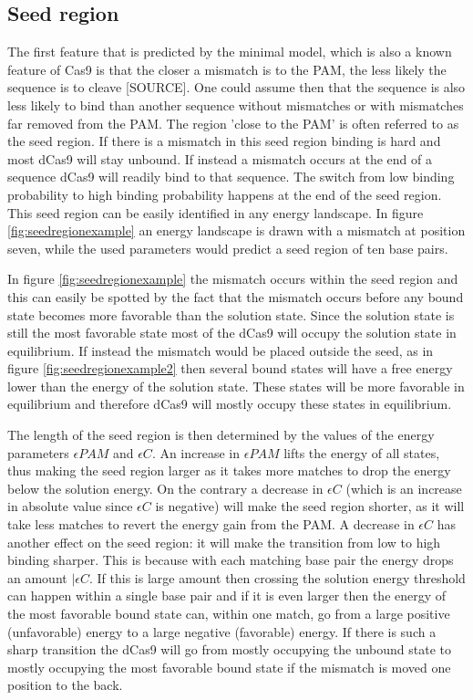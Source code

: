 \subsection{Seed region}
The first feature that is predicted by the minimal model, which is also a known feature of Cas9 is that the closer a mismatch is to the PAM, the less likely the sequence is to cleave [SOURCE]. One could assume then that the sequence is also less likely to bind than another sequence without mismatches or with mismatches far removed from the PAM. The region 'close to the PAM' is often referred to as the seed region. If there is a mismatch in this seed region binding is hard and most dCas9 will stay unbound. If instead a mismatch occurs at the end of a sequence dCas9 will readily bind to that sequence. The switch from low binding probability to high binding probability happens at the end of the seed region. This seed region can be easily identified in any energy landscape. In figure \ref{fig:seedregionexample} an energy landscape is drawn with a mismatch at position seven, while the used parameters would predict a seed region of ten base pairs.


In figure \ref{fig:seedregionexample} the mismatch occurs within the seed region and this can easily be spotted by the fact that the mismatch occurs before any bound state becomes more favorable than the solution state. Since the solution state is still the most favorable state most of the dCas9 will occupy the solution state in equilibrium. If instead the mismatch would be placed outside the seed, as in figure \ref{fig:seedregionexample2} then several bound states will have a free energy lower than the energy of the solution state. These states will be more favorable in equilibrium and therefore dCas9 will mostly occupy these states in equilibrium.

The length of the seed region is then determined by the values of the energy parameters $\epsilon PAM$ and $\epsilon C$. An increase in $\epsilon PAM$ lifts the energy of all states, thus making the seed region larger as it takes more matches to drop the energy below the solution energy. On the contrary a decrease in $\epsilon C$ (which is an increase in absolute value since $\epsilon C$ is negative) will make the seed region shorter, as it will take less matches to revert the energy gain from the PAM. A decrease in $\epsilon C$ has another effect on the seed region: it will make the transition from low to high binding sharper. This is because with each matching base pair the energy drops an amount $|\epsilon C$. If this is large amount then crossing the solution energy threshold can happen within a single base pair and if it is even larger then the energy of the most favorable bound state can, within one match, go from a large positive (unfavorable) energy to a large negative (favorable) energy. If there is such a sharp transition the dCas9 will go from mostly occupying the unbound state to mostly occupying the most favorable bound state if the mismatch is moved one position to the back.

